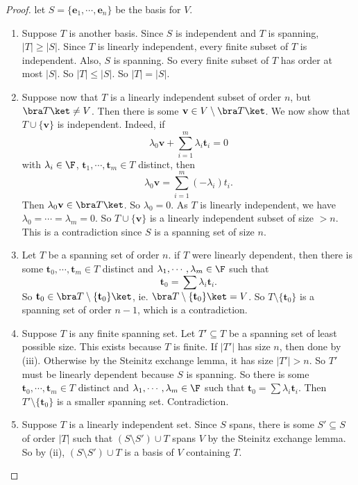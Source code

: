 \documentclass[a4paper]{article}
\begin{document}
\begin{proof}
  let $S = \{\mathbf{e}_1, \cdots, \mathbf{e}_n\}$ be the basis for $V$.
  \begin{enumerate}
    \item Suppose $T$ is another basis. Since $S$ is independent and $T$ is spanning, $|T| \geq |S|$. Since $T$ is linearly independent, every finite subset of $T$ is independent. Also, $S$ is spanning. So every finite subset of $T$ has order at most $|S|$. So $|T| \leq |S|$. So $|T| = |S|$.

    \item Suppose now that $T$ is a linearly independent subset of order $n$, but $\bra T\ket \not= V$. Then there is some $\mathbf{v} \in V\setminus \bra T\ket$. We now show that $T\cup \{\mathbf{v}\}$ is independent. Indeed, if
      \[
        \lambda_0 \mathbf{v} + \sum_{i = 1}^m \lambda_i \mathbf{t}_i = 0
      \]
      with $\lambda_i \in \F$, $\mathbf{t}_1, \cdots, \mathbf{t}_m\in T$ distinct, then
      \[
        \lambda_0 \mathbf{v} = \sum_{i = 1}^m (-\lambda_i) t_i.
      \]
      Then $\lambda_0 \mathbf{v} \in \bra T\ket$. So $\lambda_0= 0$. As $T$ is linearly independent, we have $\lambda_0 = \cdots = \lambda_m = 0$. So $T\cup \{\mathbf{v}\}$ is a linearly independent subset of size $> n$. This is a contradiction since $S$ is a spanning set of size $n$.

    \item Let $T$ be a spanning set of order $n$. if $T$ were linearly dependent, then there is some $\mathbf{t}_0, \cdots, \mathbf{t}_m \in T$ distinct and $\lambda_1, \cdots, \lambda_m \in \F$ such that
      \[
        \mathbf{t}_0 = \sum \lambda_i \mathbf{t}_i.
      \]
      So $\mathbf{t}_0 \in \bra T\setminus \{\mathbf{t}_0\}\ket$, ie. $\bra T\setminus \{\mathbf{t}_0\} \ket = V$. So $T\setminus \{\mathbf{t}_0\}$ is a spanning set of order $n - 1$, which is a contradiction.

    \item Suppose $T$ is any finite spanning set. Let $T' \subseteq T$ be a spanning set of least possible size. This exists because $T$ is finite. If $|T'|$ has size $n$, then done by (iii). Otherwise by the Steinitz exchange lemma, it has size $|T'| > n$. So $T'$ must be linearly dependent because $S$ is spanning. So there is some $\mathbf{t}_0, \cdots, \mathbf{t}_m \in T$ distinct and $\lambda_1, \cdots, \lambda_m \in \F$ such that $\mathbf{t}_0 = \sum \lambda_i \mathbf{t}_i$. Then $T'\setminus \{\mathbf{t}_0\}$ is a smaller spanning set. Contradiction.

    \item Suppose $T$ is a linearly independent set. Since $S$ spans, there is some $S' \subseteq S$ of order $|T|$ such that $(S\setminus S')\cup T$ spans $V$ by the Steinitz exchange lemma. So by (ii), $(S\setminus S')\cup T$ is a basis of $V$ containing $T$.
  \end{enumerate}
\end{proof}
\end{document}
